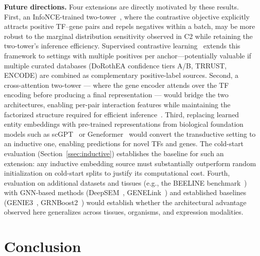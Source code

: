 \documentclass[journal]{IEEEtran}
\begin{document}
\textbf{Future directions.} Four extensions are directly motivated by these
results. First, an InfoNCE-trained two-tower~\cite{oord2018}, where the
contrastive objective explicitly attracts positive TF--gene pairs and repels
negatives within a batch, may be more robust to the marginal distribution
sensitivity observed in C2 while retaining the two-tower's inference
efficiency. Supervised contrastive learning~\cite{khosla2020} extends this
framework to settings with multiple positives per anchor---potentially
valuable if multiple curated databases (DoRothEA confidence tiers A/B,
TRRUST, ENCODE) are combined as complementary positive-label sources.
Second, a cross-attention two-tower --- where the gene encoder attends over
the TF encoding before producing a final representation --- would bridge the
two architectures, enabling per-pair interaction features while maintaining
the factorized structure required for efficient inference~\cite{humeau2020}.
Third, replacing learned entity embeddings with pre-trained representations
from biological foundation models such as scGPT~\cite{cui2024} or
Geneformer~\cite{theodoris2023} would convert the transductive setting to
an inductive one, enabling predictions for novel TFs and genes. The
cold-start evaluation (Section~\ref{ssec:inductive}) establishes the
baseline for such an extension: any inductive embedding source must
substantially outperform random initialization on cold-start splits to
justify its computational cost.
Fourth, evaluation on additional datasets and tissues (e.g., the BEELINE
benchmark~\cite{pratapa2020}) with GNN-based methods
(DeepSEM~\cite{shu2022}, GENELink~\cite{chen2022genelink}) and established
baselines (GENIE3~\cite{huynh2010}, GRNBoost2~\cite{moerman2019})
would establish whether the architectural advantage observed here generalizes
across tissues, organisms, and expression modalities.

\section{Conclusion}
\label{sec:conclusion}
\end{document}
